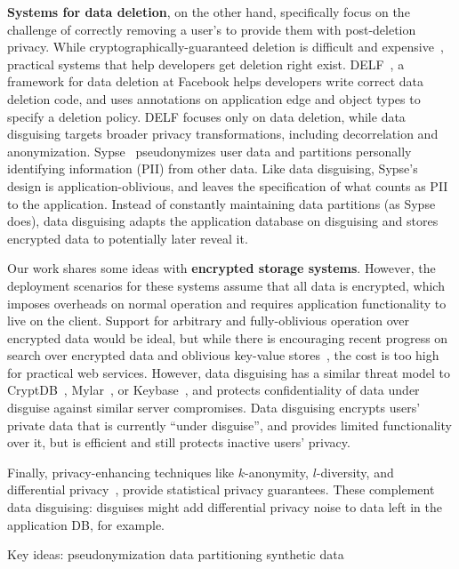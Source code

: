 %
\textbf{Systems for data deletion}, on the other hand, specifically focus on the
challenge of correctly removing a user's to provide them with post-deletion
privacy.
%
While cryptographically-guaranteed deletion is difficult and expensive~\cite{vanish},
practical systems that help developers get deletion right exist.
%
DELF~\cite{delf}, a framework for data deletion at Facebook helps developers write
correct data deletion code, and uses annotations on application edge and object types
to specify a deletion policy.
%
DELF focuses only on data deletion, while data disguising targets broader privacy
transformations, including decorrelation and anonymization.
%
Sypse~\cite{sypse} pseudonymizes user data and partitions personally identifying
information (PII) from other data.
%
Like data disguising, Sypse's design is application-oblivious, and leaves
the specification of what counts as PII to the application.
%
Instead of constantly maintaining data partitions (as Sypse does), data disguising
adapts the application database on disguising and stores encrypted data to
potentially later reveal it.
%

%
Our work shares some ideas with \textbf{encrypted storage systems}.
%
However, the deployment scenarios for these systems assume that all data is
encrypted, which imposes overheads on normal operation and requires application
functionality to live on the client.
%
Support for arbitrary and fully-oblivious operation over encrypted data would
be ideal, but while there is encouraging recent progress on search over encrypted
data and oblivious key-value stores~\cite{dory, snoopy}, the cost is too high for
practical web services.
%
However, data disguising has a similar threat model to CryptDB~\cite{cryptdb},
Mylar~\cite{mylar}, or Keybase~\cite{keybase}, and protects confidentiality of
data under disguise against similar server compromises.
%
Data disguising encrypts users' private data that is currently ``under disguise'',
and provides limited functionality over it, but is efficient and still protects
inactive users' privacy.
%

%
Finally, privacy-enhancing techniques like $k$-anonymity, $l$-diversity, and
differential privacy~\cite{dataminingmodels, differential}, provide statistical privacy
guarantees.
%
These complement data disguising: disguises might add differential privacy noise to
data left in the application DB, for example.
%



\iffalse
Key ideas:
    pseudonymization
    data partitioning
    synthetic data

